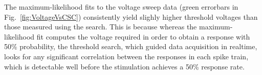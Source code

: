 \documentclass[10pt,letterpaper]{article}
\newcommand\fig[1]{Fig.~\ref{#1}}
\newcommand{\noprint}[1]{}
\begin{document}
The maximum-likelihood fits to the voltage sweep data (green errorbars in \fig{fig:VoltageVsCSC}) consistently yield slighly higher threshold voltages than those measured using the search.  This is because whereas the maximum-likelihood fit computes the voltage required in order to obtain a response with 50\% probability, the threshold search, which guided data acquisition in realtime, looks for any significant correlation between the responses in each spike train, which is detectable well before the stimulation achieves a 50\% response rate.

\noprint{FIXME: The following caveat doesn't apply to lw95rhp-2015-12-04: Each threshold scan terminated when a stimulation voltage over 3 V was detected, so for some datasets (e.g. lw95rhp-2015-12-09) we were unable to acquire all five measurements for some CSCs, and thus they are worse than the figure shows.}  
\end{document}
